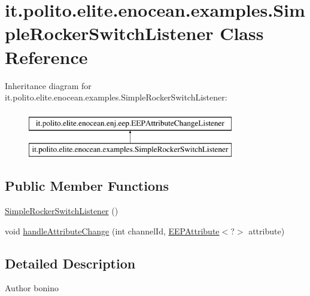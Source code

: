 \hypertarget{classit_1_1polito_1_1elite_1_1enocean_1_1examples_1_1_simple_rocker_switch_listener}{}\section{it.\+polito.\+elite.\+enocean.\+examples.\+Simple\+Rocker\+Switch\+Listener Class Reference}
\label{classit_1_1polito_1_1elite_1_1enocean_1_1examples_1_1_simple_rocker_switch_listener}
Inheritance diagram for it.\+polito.\+elite.\+enocean.\+examples.\+Simple\+Rocker\+Switch\+Listener\+:\begin{figure}[H]
\begin{center}
\leavevmode
\includegraphics[height=2.000000cm]{classit_1_1polito_1_1elite_1_1enocean_1_1examples_1_1_simple_rocker_switch_listener}
\end{center}
\end{figure}
\subsection*{Public Member Functions}
\begin{DoxyCompactItemize}
\item 
\hyperlink{classit_1_1polito_1_1elite_1_1enocean_1_1examples_1_1_simple_rocker_switch_listener_a7d484d2ffa6d7c912dabd28a76becdda}{Simple\+Rocker\+Switch\+Listener} ()
\item 
void \hyperlink{classit_1_1polito_1_1elite_1_1enocean_1_1examples_1_1_simple_rocker_switch_listener_a240a314a6f13130d31c70dac34ad0348}{handle\+Attribute\+Change} (int channel\+Id, \hyperlink{classit_1_1polito_1_1elite_1_1enocean_1_1enj_1_1eep_1_1_e_e_p_attribute}{E\+E\+P\+Attribute}$<$?$>$ attribute)
\end{DoxyCompactItemize}


\subsection{Detailed Description}
\begin{DoxyAuthor}{Author}
bonino 
\end{DoxyAuthor}


